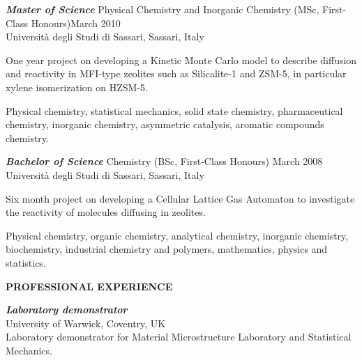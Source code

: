 \documentclass[a4paper,10pt,final]{memoir}
\newcommand{\Sep}{\vspace{1.5em}}
\newcommand{\SmallSep}{\vspace{0.5em}}
\newcommand{\CVSection}[1]
	{\Large\textbf{#1}\par
	\SmallSep\normalsize\normalfont}
\newcommand{\CVItem}[2]
	{\textit{\textbf{\color{RoyalBlue} #1}} #2}
\begin{document}
\CVItem{Master of Science}{Physical Chemistry and Inorganic Chemistry (MSc, First-Class Honours)\hfill March 2010}\\
Universit\`a degli Studi di Sassari, Sassari, Italy %
\begin{description} [style=multiline,leftmargin=3cm,font=\normalfont] \itemsep -2pt
\item [Thesis:] One year project on developing a Kinetic Monte Carlo model to describe
  diffusion and reactivity in MFI-type zeolites such as Silicalite-1 and ZSM-5, in
  particular xylene
  isomerization on HZSM-5.
\item[Main subjects:] Physical chemistry, statistical mechanics, solid state chemistry,
  pharmaceutical chemistry, inorganic chemistry, asymmetric catalysis, aromatic compounds
  chemistry. 
\end{description}
\SmallSep
 
\CVItem{Bachelor of Science}{Chemistry (BSc, First-Class Honours) \hfill  March 2008}\\
Universit\`a degli Studi di Sassari, Sassari, Italy %
\begin{description} [style=multiline,leftmargin=3cm,font=\normalfont] \itemsep -2pt
\item [Thesis:] Six month project on developing a Cellular Lattice Gas Automaton to investigate
the reactivity of molecules diffusing in zeolites.
\item[Main subjects:] Physical chemistry, organic chemistry, analytical chemistry,
  inorganic chemistry, biochemistry, industrial chemistry and polymers, mathematics,
  physics and statistics.
\end{description}


\Sep
\CVSection{PROFESSIONAL EXPERIENCE} 
\CVItem{Laboratory demonstrator} \\ %
University of Warwick, Coventry, UK  \\
Laboratory demonstrator for Material Microstructure Laboratory and Statistical Mechanics. 
\end{document}
